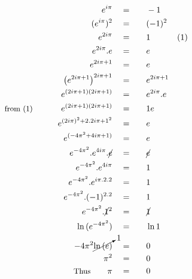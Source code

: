 \begin{alignat*}{5}
&\,&e^{i\pi}\quad&=\quad&&-1\\
&\,&(e^{i\pi})^2\quad&=&&(-1)^2\\
&\,&e^{2i\pi}\quad&=&&1\qquad&\small(1)\\
&\,&e^{2i\pi}.e\quad&=&&e\\
&\,&e^{2i\pi+1}\quad&=&&e\\
&\,&\left(e^{2i\pi+1}\right)^{2i\pi+1}\quad&=&&e^{2i\pi+1}\\
&\,&e^{(2i\pi+1)(2i\pi+1)}\quad&=&&e^{2i\pi}.e\\
&\small\text{from (1)}\normalsize\qquad&e^{(2i\pi+1)(2i\pi+1)}\quad&=&&1e\\
&\,&e^{(2i\pi)^2+2.2i\pi+1^2}\quad&=&&e\\
&\,&e^{(-4\pi^2+4i\pi+1)}\quad&=&&e\\
&\,&e^{-4\pi^2}.e^{4i\pi}.\cancel{e}\quad&=&&\cancel{e}\\
&\,&e^{-4\pi^2}.e^{4i\pi}\quad&=&&1\\
&\,&e^{-4\pi^2}.e^{i\pi.2.2}\quad&=&&1\\
&\,&e^{-4\pi^2}.(-1)^{2.2}\quad&=&&1\\
&\,&e^{-4\pi^2}.\cancel{1}^2\quad&=&&\cancel{1}\\
&\,&\ln{(e^{-4\pi^2})}\quad&=&&\ln1\\
&\,&-4\pi^2\cancelto{1}{\ln{(e)}}\quad&=&&0\\
&\,&\pi^2\quad&=&&0\\
&\,&\small\text{Thus}\normalsize\qquad\pi\quad&=&&0
\end{alignat*}

